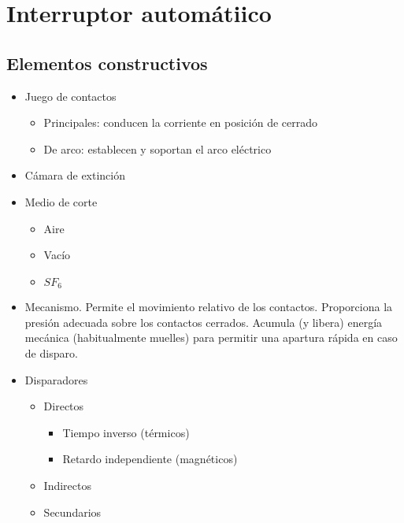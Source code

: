 \section{Interruptor automátiico}
\subsection{Elementos constructivos}
\begin{itemize}
    \item Juego de contactos
    \begin{itemize}
        \item Principales: conducen la corriente en posición de cerrado
        \item De arco: establecen y soportan el arco eléctrico
    \end{itemize}
    \item Cámara de extinción
    \item Medio de corte
    \begin{itemize}
        \item Aire
        \item Vacío
        \item $SF_6$
    \end{itemize}
    \item Mecanismo.
    Permite el movimiento relativo de los contactos. Proporciona la presión adecuada sobre los contactos cerrados. Acumula (y libera) energía mecánica (habitualmente muelles) para permitir una apartura rápida en caso de disparo.
    \item Disparadores
    \begin{itemize}
        \item Directos
        \begin{itemize}
            \item Tiempo inverso (térmicos)
            \item Retardo independiente (magnéticos)
        \end{itemize}
        \item Indirectos
        \item Secundarios
    \end{itemize}
\end{itemize}

